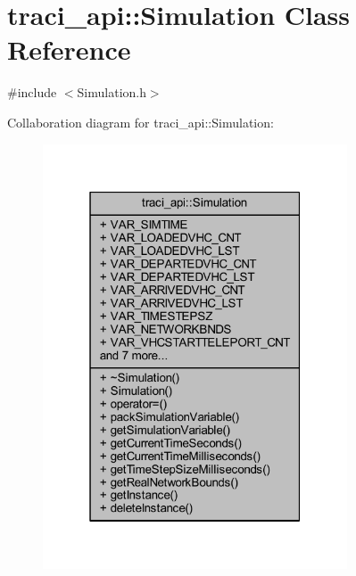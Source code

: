 \hypertarget{classtraci__api_1_1_simulation}{}\section{traci\+\_\+api\+:\+:Simulation Class Reference}
\label{classtraci__api_1_1_simulation}


{\ttfamily \#include $<$Simulation.\+h$>$}



Collaboration diagram for traci\+\_\+api\+:\+:Simulation\+:
\nopagebreak
\begin{figure}[H]
\begin{center}
\leavevmode
\includegraphics[width=256pt]{classtraci__api_1_1_simulation__coll__graph}
\end{center}
\end{figure}
